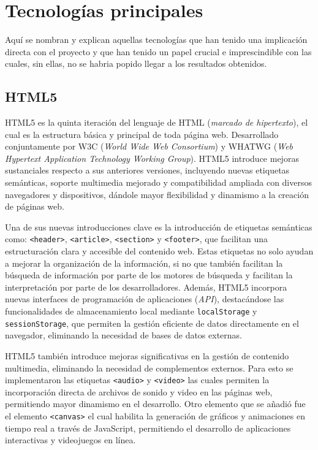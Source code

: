 \documentclass[a4paper, 12pt]{book}
\begin{document}
\section{Tecnologías principales} %
\label{sec:objetivo-general} %

Aquí se nombran y explican aquellas tecnologías que han tenido una implicación directa con el proyecto y que han tenido un papel crucial e imprescindible con las cuales, sin ellas, no se habria popido llegar a los resultados obtenidos. 

\subsection{HTML5}
\label{subsec:HTML5}

HTML5 es la quinta iteración del lenguaje de HTML (\textit{marcado de hipertexto}), el cual es la estructura básica y principal de toda página web.
Desarrollado conjuntamente por W3C (\textit{World Wide Web Consortium}) y WHATWG (\textit{Web Hypertext Application Technology Working Group}).
HTML5 introduce mejoras sustanciales respecto a sus anteriores versiones, incluyendo nuevas etiquetas semánticas, soporte multimedia mejorado y compatibilidad
ampliada con diversos navegadores y dispositivos, dándole mayor flexibilidad y dinamismo a la creación de páginas web.

Una de sus nuevas introducciones clave es la introducción de etiquetas semánticas como: \texttt{<header>}, \texttt{<article>}, \texttt{<section>} y \texttt{<footer>},
que facilitan una estructuración clara y accesible del contenido web. Estas etiquetas no solo ayudan a mejorar la organización de la información, si no que también facilitan la búsqueda
de información por parte de los motores de búsqueda y facilitan la interpretación por parte de los desarrolladores.
Además, HTML5 incorpora nuevas interfaces de programación de aplicaciones (\textit{API}), destacándose las funcionalidades de almacenamiento local mediante
\texttt{localStorage} y \texttt{sessionStorage}, que permiten la gestión eficiente de datos directamente en el navegador, eliminando la necesidad de bases de datos externas. \cite{freeman2018head}

HTML5 también introduce mejoras significativas en la gestión de contenido multimedia, eliminando la necesidad de complementos externos. Para esto se implementaron
las etiquetas \texttt{<audio>} y \texttt{<video>} las cuales permiten la incorporación directa de archivos de sonido y video en las páginas web, permitiendo mayor dinamismo en el desarrollo.
Otro elemento que se añadió fue el elemento \texttt{<canvas>} el cual habilita la generación de gráficos y animaciones en tiempo real a través de JavaScript, permitiendo el desarrollo de aplicaciones interactivas y videojuegos en línea.
\end{document}
